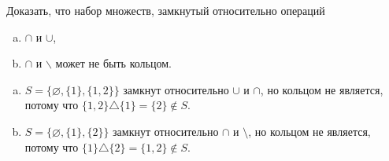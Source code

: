 \begin{task}{6}
Доказать, что набор множеств, замкнутый относительно операций
\begin{enumerate}[a)]
    \item $\cap$ и $\cup$,
    \item $\cap$ и $\backslash$ может не быть кольцом.
\end{enumerate}

\end{task}
\begin{solution}
    \begin{enumerate}[a)]
        \item
        $S = \lbrace \varnothing, \lbrace 1 \rbrace, \lbrace 1, 2 \rbrace \rbrace $ замкнут относительно $\cup$ и $\cap$, но кольцом не является, потому что $\{1,2\}\triangle\{1\} = \{2\} \notin S$.
        
        \item
        $S = \lbrace \varnothing, \lbrace 1 \rbrace, \lbrace 2 \rbrace \rbrace$ замкнут относительно $\cap$ и $\setminus$, но кольцом не является, потому что $\{1\} \triangle \{2\} = \{1, 2\} \notin S$.
    \end{enumerate}
\end{solution}